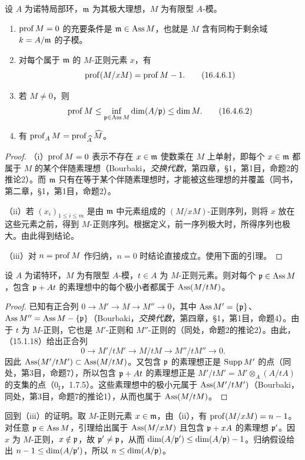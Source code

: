 设 $A$ 为诺特局部环，$\mathfrak m$ 为其极大理想，$M$ 为有限型 $A$-模。
\begin{enumerate}[label=(\roman*)]
 \item $\operatorname{prof} M=0$ 的充要条件是 $\mathfrak m\in\operatorname{Ass} M$，也就是 $M$ 含有同构于剩余域 $k=A/\mathfrak m$ 的子模。
 \item 对每个属于 $\mathfrak m$ 的 $M$-正则元素 $x$，有
 \begin{equation}
  \operatorname{prof}(M/xM)=\operatorname{prof} M-1.
  \tag{16.4.6.1}
 \end{equation}
 \item 若 $M\ne0$，则
 \begin{equation}
  \operatorname{prof} M\leq\inf_{\mathfrak p\in\operatorname{Ass} M}\dim(A/\mathfrak p)\leq\dim M.
  \tag{16.4.6.2}
 \end{equation}
 \item 有 $\operatorname{prof}_A M=\operatorname{prof}_{\widehat A}\widehat M$。
\end{enumerate}
\begin{proof}
（i）$\operatorname{prof} M=0$ 表示不存在 $x\in\mathfrak m$ 使数乘在 $M$ 上单射，即每个 $x\in\mathfrak m$ 都属于 $M$ 的某个伴随素理想（Bourbaki，\textit{交换代数}，第四章，§1，第1目，命题2的推论2）。而 $\mathfrak m$ 只有在等于某个伴随素理想时，才能被这些理想的并覆盖（同书，第二章，§1，第1目，命题2）。

（ii）若 $(x_i)_{1\leq i\leq m}$ 是由 $\mathfrak m$ 中元素组成的 $(M/xM)$-正则序列，则将 $x$ 放在这些元素之前，得到 $M$-正则序列。根据定义，前一序列极大时，所得序列也极大。由此得到结论。

（iii）对 $n=\operatorname{prof} M$ 作归纳，$n=0$ 时结论直接成立。使用下面的引理。
\renewcommand{\qedsymbol}{}
\end{proof}

设 $A$ 为诺特环，$M$ 为有限型 $A$-模，$t\in A$ 为 $M$-正则元素。则对每个 $\mathfrak p\in\operatorname{Ass} M$，包含 $\mathfrak p+At$ 的素理想中的每个极小者都属于 $\operatorname{Ass}(M/tM)$。
\begin{proof}
已知有正合列 $0\to M'\to M\to M''\to0$，其中
$\operatorname{Ass} M'=\{\mathfrak p\}$、$\operatorname{Ass} M''=\operatorname{Ass} M-\{\mathfrak p\}$（Bourbaki，\textit{交换代数}，第四章，§1，第1目，命题4）。由于 $t$ 为 $M$-正则，它也是 $M'$-正则和 $M''$-正则的（同处，命题2的推论2）。由此，（15.1.18）给出正合列
\[
 0\longrightarrow M'/tM'\longrightarrow M/tM\longrightarrow M''/tM''\longrightarrow0.
\]
因此 $\operatorname{Ass}(M'/tM')\subset\operatorname{Ass}(M/tM)$。又包含 $\mathfrak p$ 的素理想正是 $\operatorname{Supp} M'$ 的点（同处，第3目，命题7），所以包含 $\mathfrak p+At$ 的素理想正是
$M'/tM'=M'\otimes_A(A/tA)$ 的支集的点（$0_{\mathrm I}$，1.7.5）。这些素理想中的极小元属于 $\operatorname{Ass}(M'/tM')$（Bourbaki，同处，第3目，命题7的推论1），从而也属于 $\operatorname{Ass}(M/tM)$。
\end{proof}
回到（iii）的证明。取 $M$-正则元素 $x\in\mathfrak m$，由（ii），有 $\operatorname{prof}(M/xM)=n-1$。对任意 $\mathfrak p\in\operatorname{Ass} M$，引理给出属于 $\operatorname{Ass}(M/xM)$ 且包含 $\mathfrak p+xA$ 的素理想 $\mathfrak p'$。因 $x$ 为 $M$-正则，$x\notin\mathfrak p$，故 $\mathfrak p'\ne\mathfrak p$，从而
$\dim(A/\mathfrak p')\leq\dim(A/\mathfrak p)-1$。归纳假设给出 $n-1\leq\dim(A/\mathfrak p')$，所以 $n\leq\dim(A/\mathfrak p)$。

